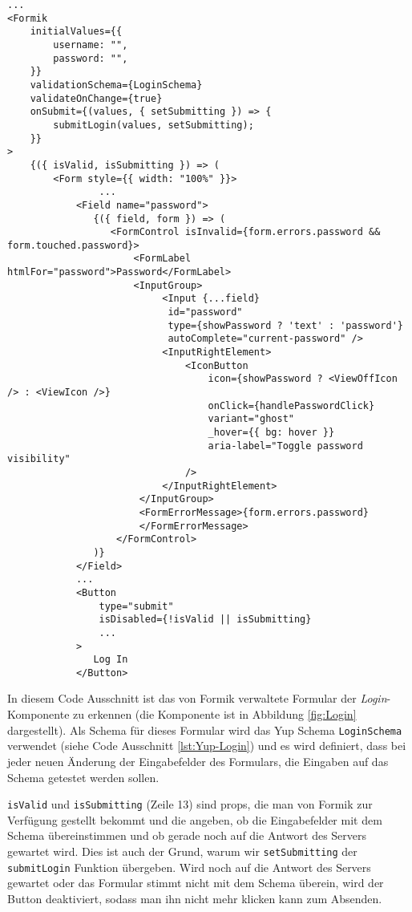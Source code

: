 \begin{lstlisting}[style=codeStyle, caption={Ein Ausschnitt der \textit{Login}-Komponente mit Formik}, label={lst:Login_Formik}]
...
<Formik
    initialValues={{
        username: "",
        password: "",
    }}
    validationSchema={LoginSchema}
    validateOnChange={true}
    onSubmit={(values, { setSubmitting }) => {
        submitLogin(values, setSubmitting);
    }}
>
    {({ isValid, isSubmitting }) => (
        <Form style={{ width: "100%" }}>
        		...
            <Field name="password">
               {({ field, form }) => (
                  <FormControl isInvalid={form.errors.password && form.touched.password}>
                      <FormLabel htmlFor="password">Password</FormLabel>
                      <InputGroup>
                           <Input {...field} 
                           	id="password" 
                           	type={showPassword ? 'text' : 'password'} 
                           	autoComplete="current-password" />
                           <InputRightElement>
                               <IconButton
                                   icon={showPassword ? <ViewOffIcon /> : <ViewIcon />}
                                   onClick={handlePasswordClick}
                                   variant="ghost"
                                   _hover={{ bg: hover }}
                                   aria-label="Toggle password visibility"
                               />
                           </InputRightElement>
                       </InputGroup>
                       <FormErrorMessage>{form.errors.password}
                       </FormErrorMessage>
                   </FormControl>
               )}
            </Field>
            ...
            <Button
                type="submit"
                isDisabled={!isValid || isSubmitting}
                ...
            >
               Log In
            </Button>
\end{lstlisting}

In diesem Code Ausschnitt ist das von Formik verwaltete Formular der \textit{Login}-Komponente zu erkennen (die Komponente ist in Abbildung \ref{fig:Login} dargestellt). Als Schema für dieses Formular wird das Yup Schema \verb|LoginSchema| verwendet (siehe Code Ausschnitt \ref{lst:Yup-Login}) und es wird definiert, dass bei jeder neuen Änderung der Eingabefelder des Formulars, die Eingaben auf das Schema getestet werden sollen.

\verb|isValid| und \verb|isSubmitting| (Zeile 13) sind props, die man von Formik zur Verfügung gestellt bekommt und die angeben, ob die Eingabefelder mit dem Schema übereinstimmen und ob gerade noch auf die Antwort des Servers gewartet wird. Dies ist auch der Grund, warum wir \verb|setSubmitting| der \verb|submitLogin| Funktion übergeben. Wird noch auf die Antwort des Servers gewartet oder das Formular stimmt nicht mit dem Schema überein, wird der Button deaktiviert, sodass man ihn nicht mehr klicken kann zum Absenden.


